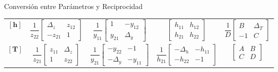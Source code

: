 \documentclass[10pt, aspectratio=169]{beamer}
\begin{document}
\begin{frame}{Conversión entre Parámetros y Reciprocidad}
\begin{center}
\begin{tabular}{c | c c c c}
            $\mathbf{[h]}$ & $\dfrac{1}{z_{22}}\begin{bmatrix} \Delta_z & z_{12} \\ -z_{21} & 1 \end{bmatrix}$       & $\dfrac{1}{y_{11}}\begin{bmatrix} 1 & -y_{12} \\ y_{21} & \Delta_y \end{bmatrix}$       & $\begin{bmatrix} h_{11} & h_{12} \\ h_{21} & h_{22} \end{bmatrix}$                   & $\dfrac{1}{D}\begin{bmatrix} B & \Delta_T \\ -1 & C \end{bmatrix}$  \\[0.4cm]
            $\mathbf{[T]}$ & $\dfrac{1}{z_{21}}\begin{bmatrix} z_{11} & \Delta_z \\ 1 & z_{22} \end{bmatrix}$        & $\dfrac{1}{y_{21}}\begin{bmatrix} -y_{22} & -1 \\ -\Delta_y & -y_{11} \end{bmatrix}$    & $\dfrac{1}{h_{21}}\begin{bmatrix} -\Delta_h & -h_{11} \\ -h_{22} & -1 \end{bmatrix}$ & $\begin{bmatrix} A & B \\ C & D \end{bmatrix}$
        \end{tabular}
    \end{center}
\end{frame}
\end{document}
